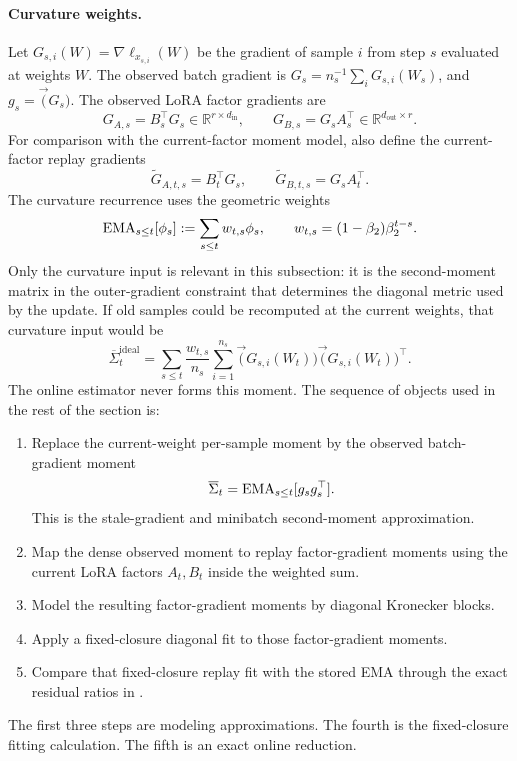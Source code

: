 \paragraph{Curvature weights.}
Let $G_{s,i}(W)=\nabla\ell_{x_{s,i}}(W)$ be the gradient of sample $i$ from
step $s$ evaluated at weights $W$. The observed batch gradient is
$G_s=n_s^{-1}\sum_iG_{s,i}(W_s)$, and $g_s=\vec(G_s)$. The observed LoRA factor
gradients are
\[
  G_{A,s}=B_s^\top G_s\in\mathbb{R}^{r\times d_{\mathrm{in}}},
  \qquad
  G_{B,s}=G_sA_s^\top\in\mathbb{R}^{d_{\mathrm{out}}\times r}.
\]
For comparison with the current-factor moment model, also define the
current-factor replay gradients
\[
  \widetilde G_{A,t,s}=B_t^\top G_s,
  \qquad
  \widetilde G_{B,t,s}=G_sA_t^\top .
\]
The curvature recurrence uses the geometric weights
\[
  \operatorname{EMA}_{s\leq t}[\phi_s]
  :=
  \sum_{s\leq t}w_{t,s}\phi_s,
  \qquad
  w_{t,s}=(1-\beta_2)\beta_2^{t-s}.
\]
Only the curvature input is relevant in this subsection: it is the
second-moment matrix in the outer-gradient constraint that determines the
diagonal metric used by the update. If old samples could be recomputed at the
current weights, that curvature input would be
\[
  \overline\Sigma^{\mathrm{ideal}}_t
  =
  \sum_{s\le t}\frac{w_{t,s}}{n_s}\sum_{i=1}^{n_s}
  \vec(G_{s,i}(W_t))\vec(G_{s,i}(W_t))^\top .
\]
The online estimator never forms this moment. The sequence of objects used in
the rest of the section is:
\begin{enumerate}[leftmargin=1.6em,itemsep=2pt,topsep=2pt]
  \item Replace the current-weight per-sample moment by the observed
  batch-gradient moment
  \[
    \overline\Sigma_t
    =
    \operatorname{EMA}_{s\leq t}[g_sg_s^\top].
  \]
  This is the stale-gradient and minibatch second-moment approximation.
  \item Map the dense observed moment to replay factor-gradient moments using
  the current LoRA factors $A_t,B_t$ inside the weighted sum.
  \item Model the resulting factor-gradient moments by diagonal Kronecker
  blocks.
  \item Apply a fixed-closure diagonal fit to those factor-gradient moments.
  \item Compare that fixed-closure replay fit with the stored EMA through the
  exact residual ratios in .
\end{enumerate}
The first three steps are modeling approximations. The fourth is the
fixed-closure fitting calculation. The fifth is an exact online reduction.

